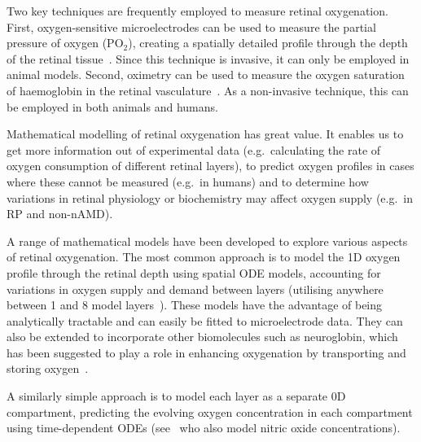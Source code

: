 \documentclass{article}
\begin{document}
Two key techniques are frequently employed to measure retinal oxygenation. First, oxygen-sensitive microelectrodes can be used to measure the partial pressure of oxygen (PO$_2$), creating a spatially detailed profile through the depth of the retinal tissue~\cite{Linsenmeier_and_Zhang_2017}. Since this technique is invasive, it can only be employed in animal models. Second, oximetry can be used to measure the oxygen saturation of haemoglobin in the retinal vasculature~\cite{Linsenmeier_and_Zhang_2017}. As a non-invasive technique, this can be employed in both animals and humans.

Mathematical modelling of retinal oxygenation has great value. It enables us to get more information out of experimental data (e.g.\ calculating the rate of oxygen consumption of different retinal layers), to predict oxygen profiles in cases where these cannot be measured (e.g.\ in humans) and to determine how variations in retinal physiology or biochemistry may affect oxygen supply (e.g.\ in RP and non-nAMD).

A range of mathematical models have been developed to explore various aspects of retinal oxygenation. The most common approach is to model the 1D oxygen profile through the retinal depth using spatial ODE models, accounting for variations in oxygen supply and demand between layers (utilising anywhere between 1 and 8 model layers~\cite{Braun_et_al_1995,Cringle_and_Yu_2002,Dollery_et_al_1969,Haugh_et_al_1990,Linsenmeier_1986,Stefansson_1988}). These models have the advantage of being analytically tractable and can easily be fitted to microelectrode data. They can also be extended to incorporate other biomolecules such as neuroglobin, which has been suggested to play a role in enhancing oxygenation by transporting and storing oxygen~\cite{Fago_et_al_2004_b,Roberts_et_al_2016a}.

A similarly simple approach is to model each layer as a separate 0D compartment, predicting the evolving oxygen concentration in each compartment using time-dependent ODEs (see~\cite{German_et_al_2021} who also model nitric oxide concentrations).
\end{document}
